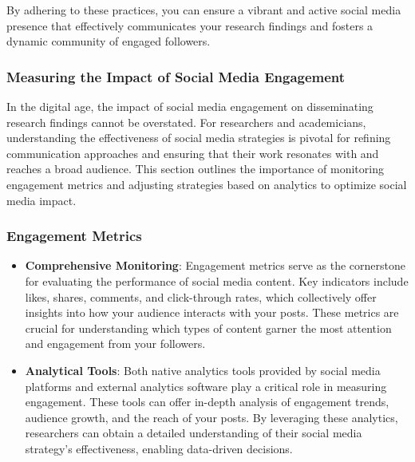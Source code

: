 \documentclass[
]{book}
\begin{document}
By adhering to these practices, you can ensure a vibrant and active social media presence that effectively communicates your research findings and fosters a dynamic community of engaged followers.

\hypertarget{measuring-the-impact-of-social-media-engagement}{%
\subsubsection*{Measuring the Impact of Social Media Engagement}\label{measuring-the-impact-of-social-media-engagement}}

In the digital age, the impact of social media engagement on disseminating research findings cannot be overstated. For researchers and academicians, understanding the effectiveness of social media strategies is pivotal for refining communication approaches and ensuring that their work resonates with and reaches a broad audience. This section outlines the importance of monitoring engagement metrics and adjusting strategies based on analytics to optimize social media impact.

\hypertarget{engagement-metrics}{%
\subsubsection*{Engagement Metrics}\label{engagement-metrics}}

\begin{itemize}
\item
  \textbf{Comprehensive Monitoring}: Engagement metrics serve as the cornerstone for evaluating the performance of social media content. Key indicators include likes, shares, comments, and click-through rates, which collectively offer insights into how your audience interacts with your posts. These metrics are crucial for understanding which types of content garner the most attention and engagement from your followers.
\item
  \textbf{Analytical Tools}: Both native analytics tools provided by social media platforms and external analytics software play a critical role in measuring engagement. These tools can offer in-depth analysis of engagement trends, audience growth, and the reach of your posts. By leveraging these analytics, researchers can obtain a detailed understanding of their social media strategy's effectiveness, enabling data-driven decisions.
\end{itemize}
\end{document}
